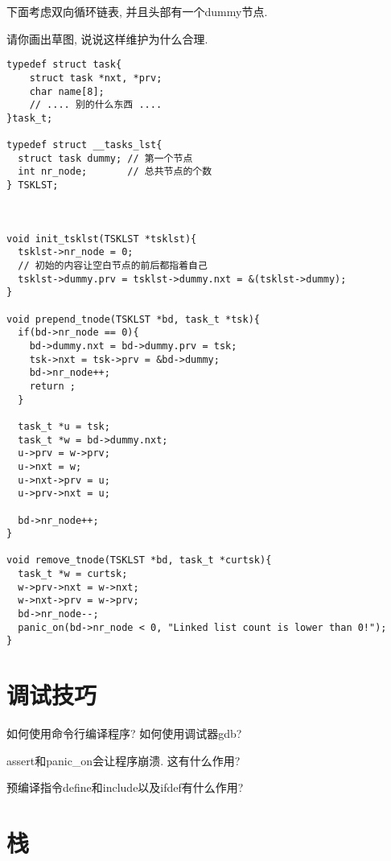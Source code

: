 \documentclass{ctexart}
\begin{document}
下面考虑双向循环链表, 并且头部有一个dummy节点. 

\begin{exc}
    请你画出草图, 说说这样维护为什么合理. 
\end{exc}

\begin{lstlisting}
typedef struct task{
    struct task *nxt, *prv;
    char name[8];
    // .... 别的什么东西 ....
}task_t;

typedef struct __tasks_lst{
  struct task dummy; // 第一个节点
  int nr_node;       // 总共节点的个数
} TSKLST;



void init_tsklst(TSKLST *tsklst){
  tsklst->nr_node = 0;
  // 初始的内容让空白节点的前后都指着自己
  tsklst->dummy.prv = tsklst->dummy.nxt = &(tsklst->dummy);
}

void prepend_tnode(TSKLST *bd, task_t *tsk){
  if(bd->nr_node == 0){
    bd->dummy.nxt = bd->dummy.prv = tsk;
    tsk->nxt = tsk->prv = &bd->dummy;
    bd->nr_node++;
    return ;
  }

  task_t *u = tsk;
  task_t *w = bd->dummy.nxt;
  u->prv = w->prv;
  u->nxt = w;
  u->nxt->prv = u;
  u->prv->nxt = u;

  bd->nr_node++;
}

void remove_tnode(TSKLST *bd, task_t *curtsk){
  task_t *w = curtsk;
  w->prv->nxt = w->nxt;
  w->nxt->prv = w->prv;
  bd->nr_node--;
  panic_on(bd->nr_node < 0, "Linked list count is lower than 0!");
}

\end{lstlisting}

\section{调试技巧}

\begin{exc}
    如何使用命令行编译程序? 如何使用调试器gdb?
\end{exc}

\begin{exc}
    assert和panic\_on会让程序崩溃. 这有什么作用?
\end{exc}

\begin{exc}
    预编译指令define和include以及ifdef有什么作用?
\end{exc}

\section{栈}
\end{document}

